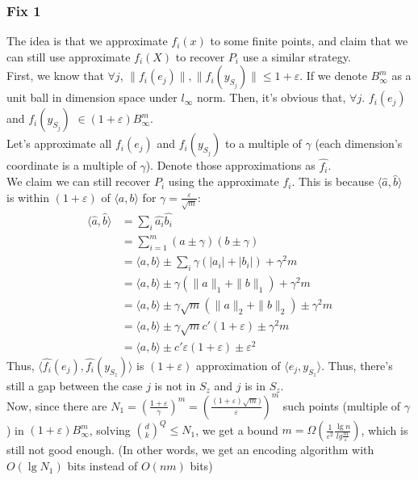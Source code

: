 \documentclass[11pt]{article}
\newcommand{\eps}{\varepsilon}
\begin{document}
\subsubsection{Fix 1}
The idea is that we approximate $f_i(x)$ to some finite points, and claim that we can still use approximate $f_i(X)$ to recover $P_i$ use a similar strategy.\\ 
First, we know that $\forall j$, $\|f_i(e_j)\|, \|f_i(y_{S_j})\| \leq 1+\eps$. If we denote $B_{\infty}^m$ as a unit ball in dimension space under $l_{\infty}$ norm. Then, it's obvious that, $\forall j$.  $f_i(e_j)$ and $f_i(y_{S_j})$ $\in (1+\eps)B_{\infty}^m$. \\
Let's approximate all  $f_i(e_j)$ and $f_i(y_{S_j})$ to a multiple of $\gamma$ (each dimension's coordinate is a multiple of $\gamma$). Denote those approximations as $\hat{f_i}$. \\
We claim we can still recover $P_i$ using the approximate $f_i$. This is because $\langle \hat{a}, \hat{b}\rangle$ is within $(1+\eps)$ of $\langle a, b \rangle$ for $\gamma = \frac{\eps}{\sqrt{m}}$: 
\begin{align}
	\langle \hat{a}, \hat{b}\rangle &= \sum_{i} \hat{a_i} \hat{b_i} \\
    &=\sum_{i=1}^{m} (a \pm \gamma) (b \pm \gamma)\\
    &= \langle a, b \rangle \pm \sum_{i} \gamma(|a_i|+|b_i|) + \gamma^2 m  \\
    & =  \langle a, b \rangle \pm \gamma (\|a\|_1 + \|b\|_1) + \gamma^2 m \\
    & = \langle a, b \rangle \pm \gamma \sqrt{m} (\|a\|_2 + \|b\|_2) \pm \gamma^2 m \\
    & = \langle a, b \rangle \pm \gamma \sqrt{m} c'(1+\eps) \pm \gamma^2 m \\
    & = \langle a, b \rangle \pm c'\eps(1+\eps) \pm \eps^2 
\end{align} 
Thus, $\langle \hat{f_i}(e_j), \hat{f_i}(y_{S_z}) \rangle$ is $(1+\eps)$ approximation of $\langle e_j, y_{S_z} \rangle$. Thus, there's still a gap between the case $j$ is not in $S_z$ and $j$ is in $S_z$. \\ 

Now, since there are $N_1=(\frac{1+\eps}{\gamma})^m = (\frac{(1+\eps)\sqrt{m})}{\eps})^m$ such points (multiple of $\gamma$) in $(1+\eps)B_{\infty}^m$, solving ${d \choose k}^Q \leq N_1$, we get a bound $m = \Omega (\frac{1}{\eps^2} \frac{\lg n}{lg \frac{m}{\eps}})$, which is still not good enough. (In other words, we get an encoding algorithm with $O(\lg N_1)$ bits instead of $O(nm)$ bits)
\end{document}
